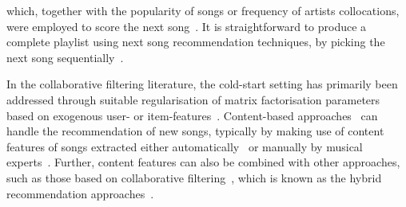 which, together with the popularity of songs or frequency of artists collocations,
were employed to score the next song~\cite{mcfee2012million,bonnin2013evaluating}.
It is straightforward to produce a complete playlist using next song recommendation techniques,
\ie by picking the next song sequentially~\cite{bonnin2013evaluating,ben2017groove}.
%


In the collaborative filtering literature,
the cold-start setting has primarily been addressed through
suitable regularisation of matrix factorisation parameters
based on exogenous user- or item-features~\cite{Ma:2008,Agarwal:2009,Cao:2010}.
%
Content-based approaches~\cite[chap. 4]{aggarwal2016recommender}
can handle the recommendation of new songs,
typically by making use of content features of songs extracted either automatically~\cite{seyerlehner2010automatic,eghbal2015vectors}
or manually by musical experts~\cite{john2006pandora}.
Further, content features can also be combined with other approaches, such as those based on 
collaborative filtering~\cite{yoshii2006hybrid,donaldson2007hybrid,shao2009music},
which is known as the hybrid recommendation approaches~\cite{burke2002hybrid,aggarwal2016recommender}.
%

